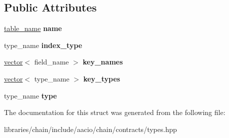 \subsection*{Public Attributes}
\begin{DoxyCompactItemize}
\item 
\mbox{\label{structaacio_1_1chain_1_1contracts_1_1table__def_a4f8fbb02d3def5cdcb40d61576c22b17}} 
\mbox{\hyperlink{structaacio_1_1chain_1_1name}{table\+\_\+name}} {\bfseries name}
\item 
\mbox{\label{structaacio_1_1chain_1_1contracts_1_1table__def_af1d98f76dbdf5ed6c7069a98f4938814}} 
type\+\_\+name {\bfseries index\+\_\+type}
\item 
\mbox{\label{structaacio_1_1chain_1_1contracts_1_1table__def_a9dee1b823706436b21ab90da3cd7cc5b}} 
\mbox{\hyperlink{classstd_1_1vector}{vector}}$<$ field\+\_\+name $>$ {\bfseries key\+\_\+names}
\item 
\mbox{\label{structaacio_1_1chain_1_1contracts_1_1table__def_a0708207bb8645497471f8d5b2981554c}} 
\mbox{\hyperlink{classstd_1_1vector}{vector}}$<$ type\+\_\+name $>$ {\bfseries key\+\_\+types}
\item 
\mbox{\label{structaacio_1_1chain_1_1contracts_1_1table__def_ac6a4e6abf051ea9a99f0348ef4196e4b}} 
type\+\_\+name {\bfseries type}
\end{DoxyCompactItemize}


The documentation for this struct was generated from the following file\+:\begin{DoxyCompactItemize}
\item 
libraries/chain/include/aacio/chain/contracts/types.\+hpp\end{DoxyCompactItemize}

